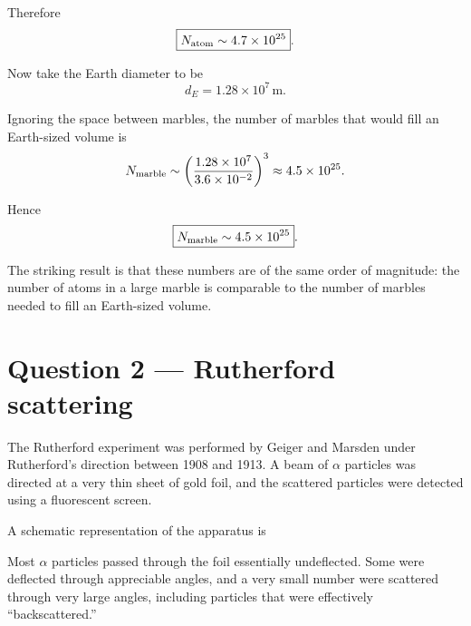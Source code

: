 \documentclass[11pt,a4paper]{article}
\begin{document}
Therefore
\[
\boxed{N_{\rm atom}\sim4.7\times10^{25}}.
\]

Now take the Earth diameter to be
\[
d_E=1.28\times10^7\,\mathrm{m}.
\]

Ignoring the space between marbles, the number of marbles that would fill an
Earth-sized volume is
\[
N_{\rm marble}
\sim
\left(\frac{1.28\times10^7}{3.6\times10^{-2}}\right)^3
\approx4.5\times10^{25}.
\]

Hence
\[
\boxed{N_{\rm marble}\sim4.5\times10^{25}}.
\]

The striking result is that these numbers are of the same order of magnitude:
the number of atoms in a large marble is comparable to the number of marbles
needed to fill an Earth-sized volume.

\section{Question 2 --- Rutherford scattering}

The Rutherford experiment was performed by Geiger and Marsden under Rutherford's
direction between 1908 and 1913. A beam of $\alpha$ particles was directed at a
very thin sheet of gold foil, and the scattered particles were detected using a
fluorescent screen.

A schematic representation of the apparatus is

\begin{center}
\end{center}

Most $\alpha$ particles passed through the foil essentially undeflected. Some were
deflected through appreciable angles, and a very small number were scattered through
very large angles, including particles that were effectively ``backscattered.''
\end{document}
